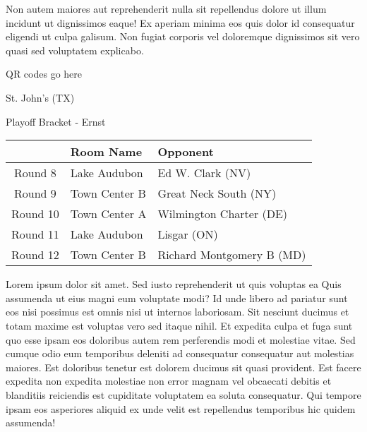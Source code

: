 \documentclass{article}%
\begin{document}
\newline%
Non autem maiores aut reprehenderit nulla sit repellendus dolore ut illum incidunt ut dignissimos eaque! Ex aperiam minima eos quis dolor id consequatur eligendi ut culpa galisum. Non fugiat corporis vel doloremque dignissimos sit vero quasi sed voluptatem explicabo.\newline%
\newline%
%
\vspace*{30pt}%
\begin{center}%
\begin{Huge}%
QR codes go here%
\end{Huge}%
\end{center}%
\newpage%
\begin{center}%
\begin{Huge}%
St. John's (TX)%
\end{Huge}%
\vspace*{8pt}%
\linebreak%
\begin{Large}%
Playoff Bracket {-} Ernst%
\end{Large}%
\end{center}%
\begin{tabularx}{\textwidth}{|c|Y|Y|}%
\hline%
&Room Name&Opponent\\%
\hline%
Round 8&Lake Audubon&Ed W. Clark (NV)\\%
Round 9&Town Center B&Great Neck South (NY)\\%
Round 10&Town Center A&Wilmington Charter (DE)\\%
Round 11&Lake Audubon&Lisgar (ON)\\%
Round 12&Town Center B&Richard Montgomery B (MD)\\%
\hline%
\end{tabularx}%
\vspace*{8pt}%
\linebreak%
\newline%
\newline%
Lorem ipsum dolor sit amet. Sed iusto reprehenderit ut quis voluptas ea Quis assumenda ut eius magni eum voluptate modi? Id unde libero ad pariatur sunt eos nisi possimus est omnis nisi ut internos laboriosam. Sit nesciunt ducimus et totam maxime est voluptas vero sed itaque nihil. Et expedita culpa et fuga sunt quo esse ipsam eos doloribus autem rem perferendis modi et molestiae vitae.\newline%
\newline%
Sed cumque odio eum temporibus deleniti ad consequatur consequatur aut molestias maiores. Est doloribus tenetur est dolorem ducimus sit quasi provident. Est facere expedita non expedita molestiae non error magnam vel obcaecati debitis et blanditiis reiciendis est cupiditate voluptatem ea soluta consequatur. Qui tempore ipsam eos asperiores aliquid ex unde velit est repellendus temporibus hic quidem assumenda!\newline%
\end{document}
